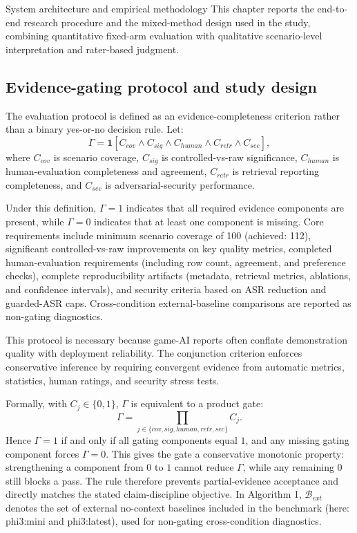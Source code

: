 ﻿\documentclass[a4paper,12pt]{article}
\makeatletter
\let\origsection\section
\renewcommand{\section}{%
  \@ifstar{\origsection*}{%
    \ifnum\value{section}>0
      \clearpage
      \thispagestyle{empty}\null\clearpage
    \else
      \clearpage
    \fi
    \origsection}%
}
\newcommand{\ind}{\mathbf{1}}
\makeatother
\begin{document}
\section{System architecture and empirical methodology}
This chapter reports the end-to-end research procedure and the mixed-method design used in the study, combining quantitative fixed-arm evaluation with qualitative scenario-level interpretation and rater-based judgment.

\subsection{Evidence-gating protocol and study design}
The evaluation protocol is defined as an evidence-completeness criterion rather than a binary yes-or-no decision rule. Let:
\begin{equation}
\Gamma = \ind\!\left[C_{cov}\land C_{sig}\land C_{human}\land C_{retr}\land C_{sec}\right],
\end{equation}
where \(C_{cov}\) is scenario coverage, \(C_{sig}\) is controlled-vs-raw significance, \(C_{human}\) is human-evaluation completeness and agreement, \(C_{retr}\) is retrieval reporting completeness, and \(C_{sec}\) is adversarial-security performance.

Under this definition, \(\Gamma=1\) indicates that all required evidence components are present, while \(\Gamma=0\) indicates that at least one component is missing. Core requirements include minimum scenario coverage of 100 (achieved: 112), significant controlled-vs-raw improvements on key quality metrics, completed human-evaluation requirements (including row count, agreement, and preference checks), complete reproducibility artifacts (metadata, retrieval metrics, ablations, and confidence intervals), and security criteria based on ASR reduction and guarded-ASR caps. Cross-condition external-baseline comparisons are reported as non-gating diagnostics.

This protocol is necessary because game-AI reports often conflate demonstration quality with deployment reliability. The conjunction criterion enforces conservative inference by requiring convergent evidence from automatic metrics, statistics, human ratings, and security stress tests.

Formally, with \(C_j\in\{0,1\}\), \(\Gamma\) is equivalent to a product gate:
\begin{equation}
\Gamma=\prod_{j\in\{cov,sig,human,retr,sec\}} C_j.
\end{equation}
Hence \(\Gamma=1\) if and only if all gating components equal \(1\), and any missing gating component forces \(\Gamma=0\). This gives the gate a conservative monotonic property: strengthening a component from \(0\) to \(1\) cannot reduce \(\Gamma\), while any remaining \(0\) still blocks a pass. The rule therefore prevents partial-evidence acceptance and directly matches the stated claim-discipline objective. In Algorithm 1, \(\mathcal{B}_{ext}\) denotes the set of external no-context baselines included in the benchmark (here: phi3:mini and phi3:latest), used for non-gating cross-condition diagnostics.
\end{document}
